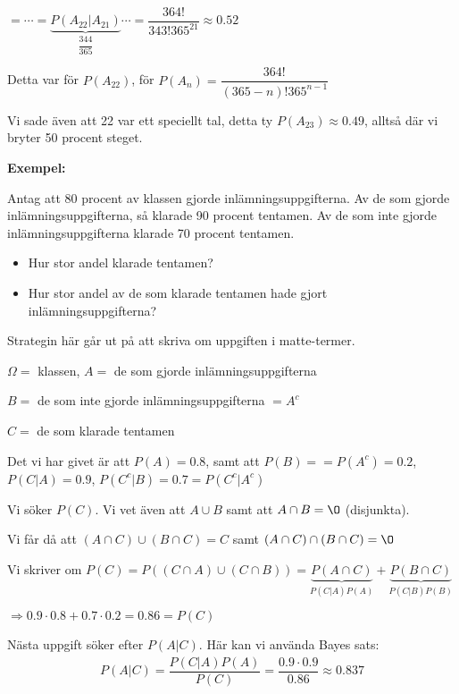 \noindent $= \cdots = \underbrace{P(A_{22}|A_{21})}_{\text{$\dfrac{344}{365}$}}\cdots = \dfrac{364!}{343!365^{21}} \approx 0.52$
\par\bigskip
\noindent Detta var för $P(A_{22})$, för $P(A_{n}) = \dfrac{364!}{(365-n)!365^{n-1}}$
\par\bigskip
\noindent Vi sade även att 22 var ett speciellt tal, detta ty $P(A_{23})\approx 0.49$, alltså där vi bryter 50 procent steget.
\par\bigskip
\noindent\textbf{Exempel:}\par
\noindent Antag att 80 procent av klassen gjorde inlämningsuppgifterna. Av de som gjorde inlämningsuppgifterna, så klarade 90 procent tentamen. Av de som inte gjorde inlämningsuppgifterna klarade 70 procent tentamen.\par
\begin{itemize}
  \item Hur stor andel klarade tentamen?
  \item Hur stor andel av de som klarade tentamen hade gjort inlämningsuppgifterna? 
\end{itemize}
\par\bigskip
\noindent Strategin här går ut på att skriva om uppgiften i matte-termer.\par
\noindent $\Omega =$ klassen, $A = $ de som gjorde inlämningsuppgifterna\par
\noindent $B =$ de som inte gjorde inlämningsuppgifterna $= A^c$\par
\noindent $C=$ de som klarade tentamen
\par\bigskip
\noindent Det vi har givet är att $P(A) = 0.8$, samt att $P(B) = =P(A^c) = 0.2$, $P(C|A) = 0.9$, $P(C^c|B) = 0.7 = P(C^c|A^c)$\par\bigskip
\noindent Vi söker $P(C)$. Vi vet även att $A\cup B$ samt att $A\cap B = \O$ (disjunkta).\par
\noindent Vi får då att $(A\cap C)\cup(B\cap C) = C$ samt $(A\cap C)\cap(B\cap C) = \O$\par
\noindent Vi skriver om $P(C) = P((C\cap A)\cup(C\cap B)) = \underbrace{P(A\cap C)}_{\text{$P(C|A)P(A)$}}+\underbrace{P(B\cap C)}_{\text{$P(C|B)P(B)$}}$\par
\noindent $\Rightarrow 0.9\cdot0.8+0.7\cdot0.2 = 0.86 = P(C)$
\par\bigskip
\noindent Nästa uppgift söker efter $P(A|C)$. Här kan vi använda Bayes sats:
\begin{equation*}
  \begin{gathered}
    P(A|C) = \dfrac{P(C|A)P(A)}{P(C)} = \dfrac{0.9\cdot0.9}{0.86} \approx 0.837
  \end{gathered}
\end{equation*}\par
